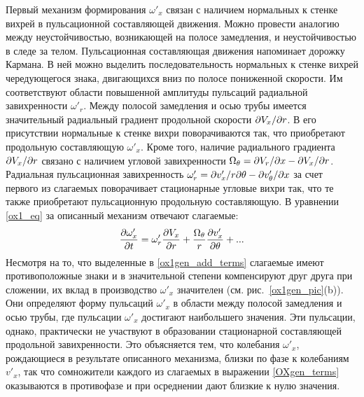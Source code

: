 Первый механизм формирования $\omega'_x$ связан с наличием нормальных к стенке вихрей в пульсационной составляющей движения. Можно провести аналогию между неустойчивостью, возникающей на полосе замедления, и неустойчивостью в следе за телом. Пульсационная составляющая движения напоминает дорожку Кармана. В ней можно выделить последовательность нормальных к стенке вихрей чередующегося знака, двигающихся вниз по полосе пониженной скорости. Им соответствуют области повышенной амплитуды пульсаций радиальной завихренности $\omega'_r$. Между полосой замедления и осью трубы имеется значительный радиальный градиент продольной скорости $\partial V_x/ \partial r$. В его присутствии нормальные к стенке вихри поворачиваются так, что приобретают продольную составляющую $\omega'_x$. Кроме того, наличие радиального градиента $\partial V_x/ \partial r$ связано с наличием угловой завихренности $\Omega_\theta = \partial V_r / \partial x - \partial V_x / \partial r$. Радиальная пульсационная завихренность $\omega'_r = \partial v'_x / r \partial \theta - \partial v'_\theta / \partial x$ за счет первого из слагаемых поворачивает стационарные угловые вихри так, что те также приобретают пульсационную продольную составляющую. В уравнении \eqref{ox1_eq} за описанный механизм отвечают слагаемые:
\begin{equation}\label{ox1gen_add_terms}
\frac{\partial \omega'_x}{\partial t} = \omega'_r \frac {\partial V_x}{\partial r} +
\frac{\Omega_\theta}{r} \frac{\partial v'_x}{\partial \theta} + ...
\end{equation}
Несмотря на то, что выделенные в \eqref{ox1gen_add_terms} слагаемые имеют противоположные знаки и в значительной степени компенсируют друг друга при сложении, их вклад в производство $\omega'_x$ значителен (см. рис.~\ref{ox1gen_pic}(b)). Они определяют форму пульсаций $\omega'_x$ в области между полосой замедления и осью трубы, где пульсации $\omega'_x$ достигают наибольшего значения. Эти пульсации, однако, практически не участвуют в образовании стационарной составляющей продольной завихренности. Это объясняется тем, что колебания $\omega'_x$, рождающиеся в результате описанного механизма, близки по фазе к колебаниям $v'_x$, так что сомножители каждого из слагаемых в выражении \eqref{OXgen_terms} оказываются в противофазе и при осреднении дают близкие к нулю значения.


